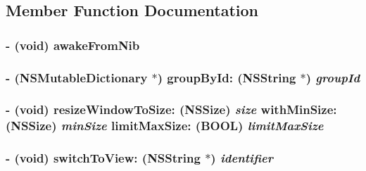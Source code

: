 \subsection{Member Function Documentation}
\hypertarget{interface_c_m_window_controller_90bc0db5d52824b64f3840ceabf8fc23}{
\subsubsection[awakeFromNib]{\setlength{\rightskip}{0pt plus 5cm}- (void) awakeFromNib }}
\label{interface_c_m_window_controller_90bc0db5d52824b64f3840ceabf8fc23}


\hypertarget{interface_c_m_window_controller_270296afa392485f936b630d5e7e0633}{
\subsubsection[groupById:]{\setlength{\rightskip}{0pt plus 5cm}- (NSMutableDictionary $\ast$) groupById: ({\bf NSString} $\ast$) {\em groupId}}}
\label{interface_c_m_window_controller_270296afa392485f936b630d5e7e0633}


\hypertarget{interface_c_m_window_controller_eb91277909122f15a5443b497ba0c29b}{
\subsubsection[resizeWindowToSize:withMinSize:limitMaxSize:]{\setlength{\rightskip}{0pt plus 5cm}- (void) resizeWindowToSize: (NSSize) {\em size}\/ withMinSize: (NSSize) {\em minSize}\/ limitMaxSize: (BOOL) {\em limitMaxSize}}}
\label{interface_c_m_window_controller_eb91277909122f15a5443b497ba0c29b}


\hypertarget{interface_c_m_window_controller_e14b0f7e31f166967f3f29a048689043}{
\subsubsection[switchToView:]{\setlength{\rightskip}{0pt plus 5cm}- (void) switchToView: ({\bf NSString} $\ast$) {\em identifier}}}
\label{interface_c_m_window_controller_e14b0f7e31f166967f3f29a048689043}


